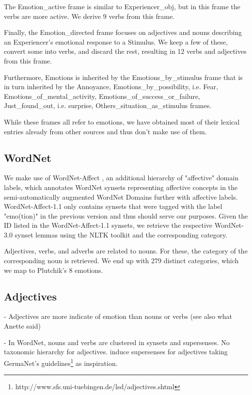 The Emotion\_active frame is similar to Experiencer\_obj, but in this frame the verbs are more active. We derive 9 verbs from this frame.

Finally, the Emotion\_directed frame focuses on adjectives and nouns describing an Experiencer's emotional response to a Stimulus. We keep a few of these, convert some into verbs, and discard the rest, resulting in 12 verbs and adjectives from this frame.

Furthermore, Emotions is inherited by the Emotions\_by\_stimulus frame that is in turn inherited by the Annoyance, Emotions\_by\_possibility, i.e. Fear, Emotions\_of\_mental\_activity, Emotions\_of\_success\_or\_failure, Just\_found\_out, i.e. surprise, Others\_situation\_as\_stimulus frames.

While these frames all refer to emotions, we have obtained most of their lexical entries already from other sources and thus don't make use of them.


\subsection{WordNet}

We make use of WordNet-Affect \cite{wordnet-affect}, an additional hierarchy of "affective" domain labels, which annotates WordNet synsets representing affective concepts in the semi-automatically augmented WordNet Domains further with affective labels. WordNet-Affect-1.1 only contains synsets that were tagged with the label "emo(tion)" in the previous version and thus should serve our purposes. Given the ID listed in the WordNet-Affect-1.1 synsets, we retrieve the respective WordNet-3.0 synset lemmas using the NLTK toolkit\cite{nltk} and the corresponding category.

Adjectives, verbs, and adverbs are related to nouns. For these, the category of the corresponding noun is retrieved. We end up with 279 distinct categories, which we map to Plutchik's 8 emotions.


\subsection{Adjectives}

- Adjectives are more indicate of emotion than nouns or verbs (see also what Anette said)

- In WordNet, nouns and verbs are clustered in synsets and supersenses. No taxonomic hierarchy for adjectives. \cite{adjective_supersenses} induce supersenses for adjectives taking GermaNet's guidelines\footnote{http://www.sfs.uni-tuebingen.de/lsd/adjectives.shtml} as inspiration.

